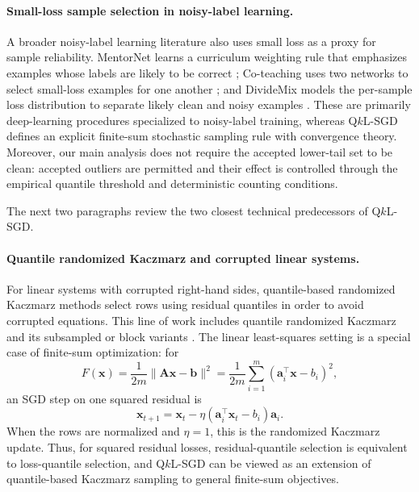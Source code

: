 \documentclass[11pt]{article}
\newcommand{\ve}[1]{\mathbf{#1}}
\begin{document}
\paragraph{Small-loss sample selection in noisy-label learning.}
A broader noisy-label learning literature also uses small loss as a proxy for
sample reliability. MentorNet learns a curriculum weighting rule that
emphasizes examples whose labels are likely to be correct
\citep{jiang2018mentornet}; Co-teaching uses two networks to select small-loss
examples for one another \citep{han2018coteaching}; and DivideMix models the
per-sample loss distribution to separate likely clean and noisy examples
\citep{li2020dividemix}. These are primarily deep-learning procedures
specialized to noisy-label training, whereas Q\(k\)L-SGD defines an explicit
finite-sum stochastic sampling rule with convergence theory. Moreover, our
main analysis does not require the accepted lower-tail set to be
clean: accepted outliers are permitted and their effect is controlled through
the empirical quantile threshold and deterministic counting conditions.


\bigskip

The next two paragraphs review the two closest technical predecessors of
Q\(k\)L-SGD.

\paragraph{Quantile randomized Kaczmarz and corrupted linear systems.}
For linear systems with corrupted right-hand sides, quantile-based randomized
Kaczmarz methods select rows using residual quantiles in order to avoid corrupted
equations. This line of work includes quantile randomized Kaczmarz and its
subsampled or block variants
\citep{haddock2019randomized,steinerberger2023quantile,HNRS20, jarman2021quantilerk,cheng2023block,haddock2023subsampled}.
The linear least-squares setting is a special case of finite-sum optimization:
for
\[
F(\ve{x})
=
\frac{1}{2m}\|\ve{A}\ve{x}-\ve{b}\|^2
=
\frac{1}{2m}\sum_{i=1}^m(\ve{a}_i^\top\ve{x}-b_i)^2,
\]
an SGD step on one squared residual is
\[
\ve{x}_{t+1}
=
\ve{x}_t
-
\eta(\ve{a}_i^\top\ve{x}_t-b_i)\ve{a}_i.
\]
When the rows are normalized and \(\eta=1\), this is the randomized Kaczmarz
update. Thus, for squared residual losses, residual-quantile selection is equivalent
to loss-quantile selection, and Q\(k\)L-SGD can be viewed as an extension of
quantile-based Kaczmarz sampling to general finite-sum objectives.
\end{document}
